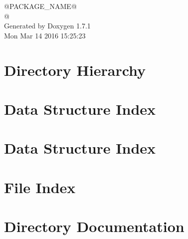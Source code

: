 \documentclass[a4paper]{book}
\begin{document}
\begin{titlepage}
\vspace*{7cm}
\begin{center}
{\Large @PACKAGE\_\-NAME@ \\[1ex]\large @ }\\
\vspace*{1cm}
{\large Generated by Doxygen 1.7.1}\\
\vspace*{0.5cm}
{\small Mon Mar 14 2016 15:25:23}\\
\end{center}
\end{titlepage}
\clearemptydoublepage
{}
\tableofcontents
\clearemptydoublepage
{}
\chapter{Directory Hierarchy}

\chapter{Data Structure Index}

\chapter{Data Structure Index}

\chapter{File Index}

\chapter{Directory Documentation}

















\end{document}
